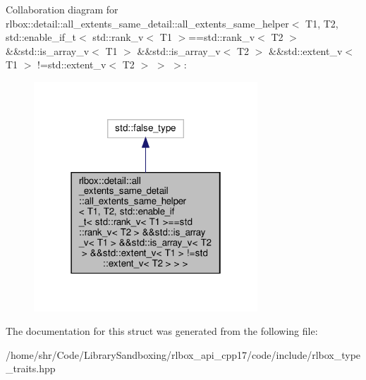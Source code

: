 Collaboration diagram for rlbox\+:\+:detail\+:\+:all\+\_\+extents\+\_\+same\+\_\+detail\+:\+:all\+\_\+extents\+\_\+same\+\_\+helper$<$ T1, T2, std\+:\+:enable\+\_\+if\+\_\+t$<$ std\+:\+:rank\+\_\+v$<$ T1 $>$==std\+:\+:rank\+\_\+v$<$ T2 $>$ \&\&std\+:\+:is\+\_\+array\+\_\+v$<$ T1 $>$ \&\&std\+:\+:is\+\_\+array\+\_\+v$<$ T2 $>$ \&\&std\+:\+:extent\+\_\+v$<$ T1 $>$ !=std\+:\+:extent\+\_\+v$<$ T2 $>$ $>$ $>$\+:
\nopagebreak
\begin{figure}[H]
\begin{center}
\leavevmode
\includegraphics[width=238pt]{structrlbox_1_1detail_1_1all__extents__same__detail_1_1all__extents__same__helper_3_01T1_00_01T2c99e36052fc437e6782967e2a051d51d}
\end{center}
\end{figure}


The documentation for this struct was generated from the following file\+:\begin{DoxyCompactItemize}
\item 
/home/shr/\+Code/\+Library\+Sandboxing/rlbox\+\_\+api\+\_\+cpp17/code/include/rlbox\+\_\+type\+\_\+traits.\+hpp\end{DoxyCompactItemize}
